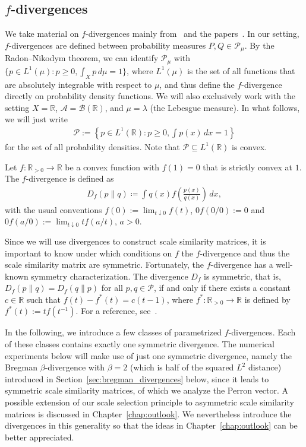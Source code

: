 \subsection{\texorpdfstring{$f$}{f}-divergences}

We take material on $f$-divergences mainly from~\cite[Chapter~7]{polyanskiy_information_2025} and the papers~\cite{sason_f-divergence_2016,sason_f-divergences_2018}. In our setting, $f$-divergences are defined between probability measures $P,Q\in\mathcal{P}_{\mu}$. By the Radon--Nikodym theorem, we can identify $\mathcal{P}_{\mu}$ with $\{p\in L^1(\mu):p\ge0,\int_{X}p\,d\mu=1\}$, where $L^1(\mu)$ is the set of all functions that are absolutely integrable with respect to $\mu$, and thus define the $f$-divergence directly on probability density functions. We will also exclusively work with the setting $X=\mathbb{R}$, $\mathcal{A}=\mathcal{B}(\mathbb{R})$, and $\mu=\lambda$ (the Lebesgue measure). In what follows, we will just write
\begin{align*}
    \mathcal{P}:=\left\{p\in L^1(\mathbb{R}):p\ge0,\int p(x)\,dx=1\right\}
\end{align*}
for the set of all probability densities. Note that $\mathcal{P}\subseteq L^1(\mathbb{R})$ is convex.

\begin{Def}[$f$-divergence]
    Let $f:\mathbb{R}_{>0}\to\mathbb{R}$ be a convex function with $f(1)=0$ that is strictly convex at $1$. The $f$-divergence is defined as
    \begin{align*}
        D_f(p\|q)\coloneqq\int q(x)f\left(\frac{p(x)}{q(x)}\right)\,dx,
    \end{align*}
    with the usual conventions $f(0):=\lim_{t\downarrow0}f(t)$, $0f(0/0):=0$ and $0f(a/0):=\lim_{t\downarrow0}tf(a/t)$, $a>0$.
\end{Def}

Since we will use divergences to construct scale similarity matrices, it is important to know under which conditions on $f$ the $f$-divergence and thus the scale similarity matrix are symmetric. Fortunately, the $f$-divergence has a well-known symmetry characterization. The divergence $D_f$ is symmetric, that is, $D_f(p\|q)=D_f(q\|p)$ for all $p,q\in\mathcal{P}$, if and only if there exists a constant $c\in\mathbb{R}$ such that $f(t)-f^{\ast}(t)=c(t-1)$, where $f^{\ast}:\mathbb{R}_{>0}\to\mathbb{R}$ is defined by $f^{\ast}(t):=tf(t^{-1})$. For a reference, see~\cite[Propositions~1 and~2]{sason_f-divergences_2018}.

In the following, we introduce a few classes of parametrized $f$-divergences. Each of these classes contains exactly one symmetric divergence. The numerical experiments below will make use of just one symmetric divergence, namely the Bregman $\beta$-divergence with $\beta=2$ (which is half of the squared $L^2$ distance) introduced in Section~\ref{sec:bregman_divergences} below, since it leads to symmetric scale similarity matrices, of which we analyze the Perron vector. A possible extension of our scale selection principle to asymmetric scale similarity matrices is discussed in Chapter~\ref{chap:outlook}. We nevertheless introduce the divergences in this generality so that the ideas in Chapter~\ref{chap:outlook} can be better appreciated.

